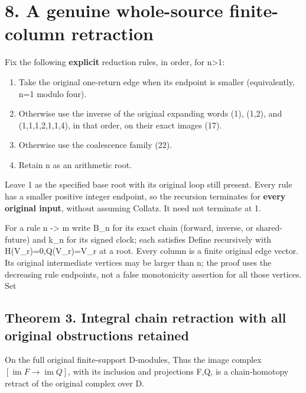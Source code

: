 \section{8. A genuine whole-source finite-column retraction}

Fix the following \textbf{explicit} reduction rules, in order, for
n\textgreater1:

\begin{enumerate}
\def\labelenumi{\arabic{enumi}.}
\tightlist
\item
  Take the original one-return edge when its endpoint is smaller
  (equivalently, n=1 modulo four).
\item
  Otherwise use the inverse of the original expanding words (1), (1,2),
  and (1,1,1,2,1,1,4), in that order, on their exact images (17).
\item
  Otherwise use the coalescence family (22).
\item
  Retain n as an arithmetic root.
\end{enumerate}

Leave 1 as the specified base root with its original loop still present.
Every rule has a smaller positive integer endpoint, so the recursion
terminates for \textbf{every original input}, without assuming Collatz.
It need not terminate at 1.

For a rule n -\textgreater{} m write B\_n for its exact chain (forward,
inverse, or shared-future) and k\_n for its signed clock; each satisfies
 Define recursively
with H(V\_r)=0,Q(V\_r)=V\_r at a root. Every column is a finite original
edge vector. Its original intermediate vertices may be larger than n;
the proof uses the decreasing rule endpoints, not a false monotonicity
assertion for all those vertices. Set

\subsection{Theorem 3. Integral chain retraction with all original
obstructions retained}

On the full original finite-support D-modules,
 Thus the image complex
\([\operatorname{im}F\to\operatorname{im}Q]\), with its inclusion and
projections F,Q, is a chain-homotopy retract of the original complex
over D.


